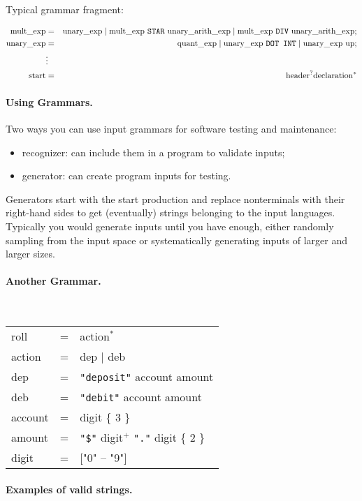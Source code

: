 \documentclass[11pt]{article}
\begin{document}
Typical grammar fragment:

\begin{eqnarray*}
\mbox{mult\_exp} &=& \mbox{unary\_exp} \mid \mbox{mult\_exp {\tt STAR} unary\_arith\_exp} \mid \mbox{mult\_exp {\tt DIV} unary\_arith\_exp}; \\
\mbox{unary\_exp} &=& \mbox{quant\_exp} \mid \mbox{unary\_exp {\tt DOT INT}}
\mid \mbox{unary\_exp up};\\
&\vdots& \\
\mbox{start} &=& \mbox{header}^? \mbox{declaration}^*
\end{eqnarray*}

\paragraph{Using Grammars.} Two ways you can use input grammars for
software testing and maintenance:
\begin{itemize}
\item recognizer: can include them in a program to validate inputs;
\item generator: can create program inputs for testing.
\end{itemize}
Generators start with the start production and replace nonterminals
with their right-hand sides to get (eventually) strings belonging to 
the input languages. Typically you would generate inputs until you have
enough, either randomly sampling from the input space or systematically
generating inputs of larger and larger sizes.

\paragraph{Another Grammar.}~\\

{\sf 
\begin{tabular}{lcl}
roll &=& action$^*$ \\
action &=& dep $\mid$ deb \\
dep &=& {\tt "deposit"} account amount \\
deb &=& {\tt "debit"} account amount \\
account &=& digit \{ 3 \} \\
amount &=& {\tt "\$"} digit$^+$ {\tt "."} digit \{ 2 \} \\
digit &=& ["0" -- "9"]
\end{tabular}
}

\paragraph{Examples of valid strings.}~\\[4em]
\end{document}
